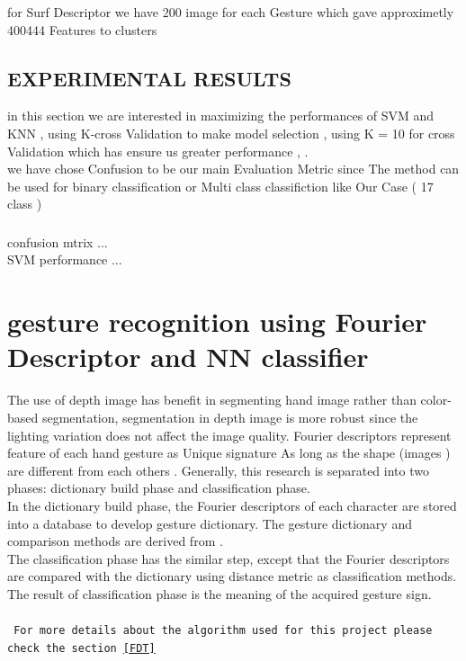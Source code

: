 \newline
for Surf Descriptor we have 200 image for each Gesture  which gave approximetly 400444 Features to clusters 
\subsection{EXPERIMENTAL RESULTS }
in this section we are interested in maximizing the performances of SVM and KNN , using K-cross Validation to make model selection , using K = 10 for cross Validation which has ensure us greater performance ,  . \\
we have chose Confusion to be our main Evaluation Metric since The method can be used for binary classification or Multi class classifiction like Our Case ( 17 class ) 

\subsubsection{ }

confusion mtrix ...\\
SVM performance ...

\newpage





\section{gesture recognition using Fourier Descriptor and NN  classifier }

 The use of depth image has benefit
in segmenting hand image rather than color-based
segmentation, segmentation in depth image is more robust
since the lighting variation does not affect the image quality.
 Fourier descriptors represent feature of each hand gesture as Unique signature As long as the shape (images ) are different from each others .
Generally, this research is separated into two phases:
dictionary build phase and classification phase. \\In the
dictionary build phase, the Fourier descriptors of each
character are stored into a database to develop gesture
dictionary. The gesture dictionary and comparison methods are
derived from \cite{clif}.\\ The classification phase has the similar
step, except that the Fourier descriptors are compared with the
dictionary using distance metric as classification methods.
The result of classification phase is the meaning of the
acquired gesture sign.\\\\
\texttt{
For more details about the algorithm used for this project please check the section \ref{FDT}
}

